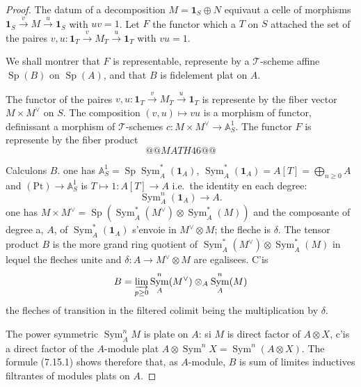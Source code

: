 \documentclass[12pt,a4paper]{article}
\theoremstyle{plain}
\theoremstyle{definition}
\DeclareMathOperator{\Sp}{Sp}
\DeclareMathOperator{\Sym}{Sym}
\begin{document}
\begin{proof}
The datum of a decomposition $M = \mathbf{1}_S \oplus N$ equivaut a celle of morphisms $\mathbf{1}_S \xrightarrow{v} M \xrightarrow{u} \mathbf{1}_S$ with $uv = 1$. Let $F$ the functor which a $T$ on $S$ attached the set of the paires $v, u : \mathbf{1}_T \xrightarrow{v} M_T \xrightarrow{u} \mathbf{1}_T$ with $vu = 1$.

We shall montrer that $F$ is representable, represente by a $\mathcal{T}$-scheme affine $\Sp(B)$ on $\Sp(A)$, and that $B$ is fidelement plat on $A$.

The functor of the paires $v, u : \mathbf{1}_T \xrightarrow{v} M_T \xrightarrow{u} \mathbf{1}_T$ is represente by the fiber vector $M \times M^\vee$ on $S$. The composition $(v, u) \mapsto vu$ is a morphism of functor, definissant a morphism of $\mathcal{T}$-schemes $c : M \times M^\vee \to \mathbb{A}^1_S$. The functor $F$ is represente by the fiber product
\[
@@MATH46@@
\]

Calculons $B$. one has $\mathbb{A}^1_S = \Sp \Sym^*_A(\mathbf{1}_A)$, $\Sym^*_A(\mathbf{1}_A) = A[T] = \bigoplus_{n \geq 0} A$ and $(\mathrm{Pt}) \to \mathbb{A}^1_S$ is $T \mapsto 1 : A[T] \to A$ i.e.~the identity en each degree:
\[
\Sym^n_A(\mathbf{1}_A) \to A.
\]
one has $M \times M^\vee = \Sp(\Sym^*_A(M^\vee) \otimes \Sym^*_A(M))$ and the composante of degree a, $A$, of $\Sym^*_A(\mathbf{1}_A)$ s'envoie in $M^\vee \otimes M$; the fleche is $\delta$. The tensor product $B$ is the more grand ring quotient of $\Sym^*_A(M^\vee) \otimes \Sym^*_A(M)$ in lequel the fleches unite and $\delta : A \to M^\vee \otimes M$ are egalisees. C'is
\begin{equation}\label{eq:7.15.1}
B = \varinjlim_{p \geq 0} \Sym^n_A(M^\vee) \otimes_A \Sym^n_A(M)
\end{equation}
the fleches of transition in the filtered colimit being the multiplication by $\delta$.

The power symmetric $\Sym^n_A M$ is plate on $A$: si $M$ is direct factor of $A \otimes X$, c'is a direct factor of the $A$-module plat $A \otimes \Sym^n X = \Sym^n(A \otimes X)$. The formule (7.15.1) shows therefore that, as $A$-module, $B$ is sum of limites inductives filtrantes of modules plats on $A$.


\end{proof}
\end{document}
